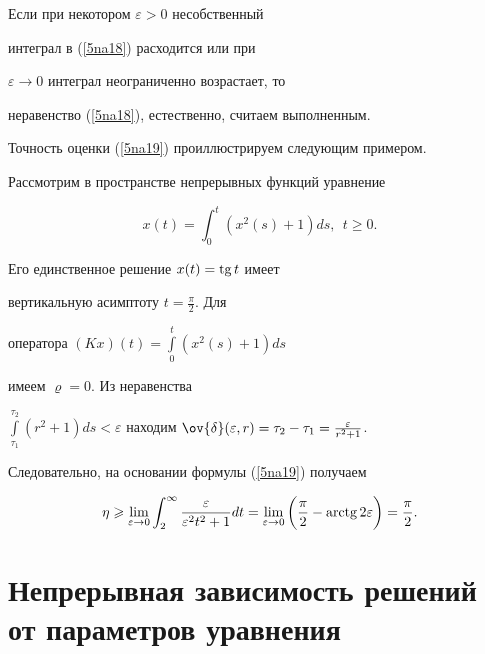 \begin{notenonum}


Если при некотором $\varepsilon >0$ несобственный


интеграл в (\ref{5na18}) расходится или при


$\varepsilon\to 0$ интеграл неограниченно возрастает, то


неравенство (\ref{5na18}), естественно, считаем выполненным.


\end{notenonum}





Точность оценки (\ref{5na19}) проиллюстрируем следующим примером.


Рассмотрим в пространстве непрерывных функций уравнение


$$


x(t)=\int_0^t (x^2 (s) +1) d s,\ \  t\geqslant 0.


$$


Его единственное решение $x(t)=\operatorname{tg} t$ имеет


вертикальную асимптоту $t=\frac{\pi}{2}$. Для


оператора $(K x)(t)=\int\limits_0^t (x^2(s)+1) ds$


имеем $\varrho=0$. Из неравенства


$\int\limits_{\tau_1}^{\tau_2} (r^2+1) 


ds<\varepsilon$ находим $\ov{\delta}


(\varepsilon, r)=\tau_2-\tau_1=\frac{\varepsilon}{r^2 +1}$.


Следовательно, на основании формулы (\ref{5na19}) получаем


$$


\eta \geqslant \lim_{\varepsilon\to


0} \int_2^\infty \frac{\varepsilon}{\varepsilon^2 t^2


+1} d t =\lim_{\varepsilon\to0}


\bigg(\frac{\pi}{2}-\arctg 2\varepsilon\bigg)= \frac{\pi}{2}.


$$








\section{Непрерывная зависимость решений от параметров уравнения}





